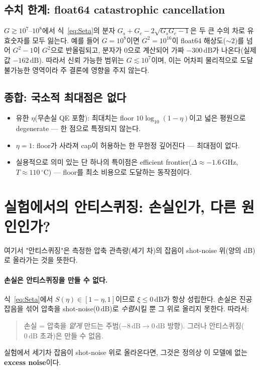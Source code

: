 \documentclass[11pt,a4paper]{article}
\newcommand{\dB}{\,\mathrm{dB}}
\newcommand{\GHz}{\,\mathrm{GHz}}
\newcommand{\degC}{\,^{\circ}\mathrm{C}}
\begin{document}
\subsection{수치 한계: float64 catastrophic cancellation}
$G\gtrsim 10^7\text{--}10^8$에서 식~\eqref{eq:Seta}의 분자
$G_s+G_c-2\sqrt{G_sG_c-1}$은 두 큰 수의 차로 유효숫자를 모두 잃는다. 예를 들어 $G=10^8$이면
$G^2=10^{16}$이 float64 해상도($\sim 2$)를 넘어 $G^2-1$이 $G^2$으로 반올림되고, 분자가
$0$으로 계산되어 가짜 $-300\dB$가 나온다(실제값 $-162\dB$). 따라서 신뢰 가능한 범위는
$G\lesssim 10^7$이며, 이는 어차피 물리적으로 도달 불가능한 영역이라 주 결론에 영향을 주지
않는다.

\subsection{종합: 국소적 최대점은 없다}
\begin{itemize}[nosep]
\item 유한 $\eta$(무손실 QE 포함): 최대치는 floor $10\log_{10}(1-\eta)$이고 넓은 평원으로
      degenerate --- 한 점으로 특정되지 않는다.
\item $\eta=1$: floor가 사라져 cap이 허용하는 한 무한정 깊어진다 --- 최대점이 없다.
\item 실용적으로 의미 있는 단 하나의 특이점은 efficient frontier($\Delta\approx -1.6\GHz$,
      $T\approx 110\degC$) --- floor를 최소 비용으로 도달하는 동작점이다.
\end{itemize}

\section{실험에서의 안티스퀴징: 손실인가, 다른 원인인가?}
여기서 "안티스퀴징"은 측정한 압축 관측량(세기 차)의 잡음이 shot-noise 위(양의 dB)로
올라가는 것을 뜻한다.

\paragraph{손실은 안티스퀴징을 만들 수 없다.}
식~\eqref{eq:Seta}에서 $S(\eta)\in[1-\eta,1]$이므로 $\xi\le 0\dB$가 항상 성립한다. 손실은
진공잡음을 섞어 압축을 shot-noise($0\dB$)로 \emph{수렴}시킬 뿐 그 위로 올리지 못한다.
따라서:
\begin{quote}
손실 = 압축을 \emph{얕게} 만드는 주범($-8\dB\to 0\dB$ 방향). 그러나 안티스퀴징($0\dB$
초과)은 만들 수 없음.
\end{quote}
실험에서 세기차 잡음이 shot-noise 위로 올라온다면, 그것은 정의상 이 모델에 없는
\textbf{excess noise}이다.
\end{document}
